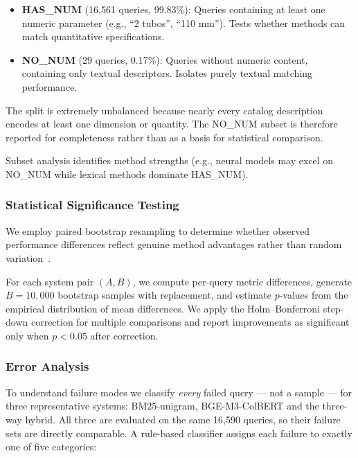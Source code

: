 \documentclass[preprint,12pt]{elsarticle}
\begin{document}
\begin{itemize}
    \item \textbf{HAS\_NUM} (16,561 queries, 99.83\%): Queries containing at least one numeric parameter (e.g., ``2 tubos'', ``110 mm''). Tests whether methods can match quantitative specifications.

    \item \textbf{NO\_NUM} (29 queries, 0.17\%): Queries without numeric content, containing only textual descriptors. Isolates purely textual matching performance.

\end{itemize}

The split is extremely unbalanced because nearly every catalog description encodes at least one dimension or quantity. The NO\_NUM subset is therefore reported for completeness rather than as a basis for statistical comparison.

Subset analysis identifies method strengths (e.g., neural models may excel on NO\_NUM while lexical methods dominate HAS\_NUM).

\subsubsection{Statistical Significance Testing}

We employ paired bootstrap resampling to determine whether observed performance differences reflect genuine method advantages rather than random variation~\citep{smucker2007comparison}.

For each system pair $(A, B)$, we compute per-query metric differences, generate $B=10{,}000$ bootstrap samples with replacement, and estimate $p$-values from the empirical distribution of mean differences. We apply the Holm--Bonferroni step-down correction for multiple comparisons and report improvements as significant only when $p < 0.05$ after correction.

\subsubsection{Error Analysis}
\label{subsec:error_taxonomy}

To understand failure modes we classify \emph{every} failed query --- not a sample --- for three representative systems: BM25-unigram, BGE-M3-ColBERT and the three-way hybrid. All three are evaluated on the same 16,590 queries, so their failure sets are directly comparable. A rule-based classifier assigns each failure to exactly one of five categories:
\end{document}
